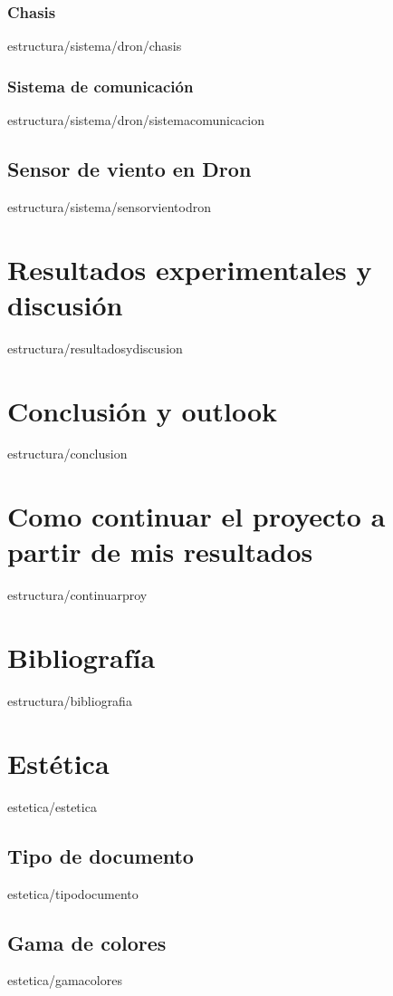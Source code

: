 \documentclass[epsbased,copyright,final,printable,covers,extendedindex,firstnumbered,tfg,gnuplot]{tfgtfmthesisuam}
\begin{document}
\subsection{Chasis\label{SS:Chasis}}{estructura/sistema/dron/chasis}
\subsection{Sistema de comunicación\label{SS:SistComunicacion}}{estructura/sistema/dron/sistemacomunicacion}
\section{Sensor de viento en Dron\label{SEC:SENSORVIENTODRON}}{estructura/sistema/sensorvientodron}

\chapter{Resultados experimentales y discusión\label{CAP:RESEXPYDISC}}{estructura/resultadosydiscusion}

\chapter{Conclusión y outlook\label{CAP:CONCLUSION}}{estructura/conclusion}

\chapter{Como continuar el proyecto a partir de mis resultados\label{CAP:CONCLUSION}}{estructura/continuarproy}

\chapter{Bibliografía\label{CAP:BIBLIOGRAFIA}}{estructura/bibliografia}





\chapter{Estética\label{CAP:ESTETICA}}{estetica/estetica}
  \section{Tipo de documento\label{SEC:TIPODOC}}{estetica/tipodocumento}
  \section{Gama de colores\label{SEC:GAMASEL}}{estetica/gamacolores}
\end{document}
